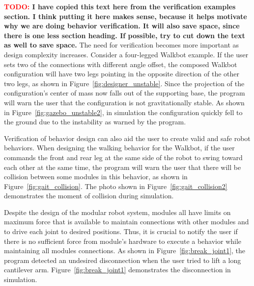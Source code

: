 \documentclass[graybox]{svmult}
\newcommand{\TODO}[1]{ {\bf \textcolor{red}{TODO:} #1 }}
\begin{document}
\TODO{I have copied this text here from the verification examples section. 
I think putting it here makes sense, because it helps motivate why we are doing
behavior verification.  It will also save space, since there is one less section
heading.  If possible, try to cut down the text as well to save space.}
The need for verification becomes more important as design complexity increases. Consider a four-legged Walkbot example. If the user sets two of the connections with different angle offset, the composed Walkbot configuration will have two legs pointing in the opposite direction of the other two legs, as shown in Figure~\ref{fig:designer_unstable}. Since the projection of the configuration's center of mass now falls out of the supporting base, the program will warn the user that the configuration is not gravitationally stable. As shown in Figure~\ref{fig:gazebo_unstable2}, in simulation the configuration quickly fell to the ground due to the instability as warned by the program. 

Verification of behavior design can also aid the user to create valid and safe robot behaviors. When designing the walking behavior for the Walkbot, if the user commands the front and rear leg at the same side of the robot to swing toward each other at the same time, the program will warn the user that there will be collision between some modules in this behavior, as shown in Figure~\ref{fig:gait_collision}. The photo shown in Figure~\ref{fig:gait_collision2} demonstrates the moment of collision during simulation.

Despite the design of the modular robot system, modules all have limits on maximum force that is available to maintain connections with other modules and to drive each joint to desired positions. Thus, it is crucial to notify the user if there is no sufficient force from module's hardware to execute a behavior while maintaining all modules connections. 
As shown in Figure~\ref{fig:break_joint1}, the program detected an undesired disconnection when the user tried to lift a long cantilever arm. Figure~\ref{fig:break_joint1} demonstrates the disconnection in simulation.
 
\end{document}
